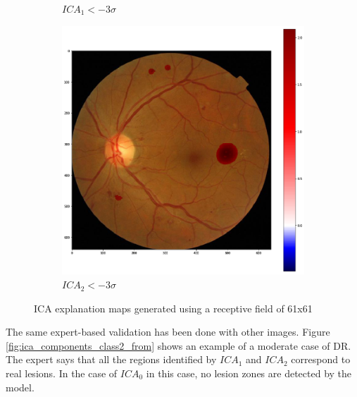 \documentclass[review]{elsarticle}
\theoremstyle{definition} %
\theoremstyle{remark}
\begin{document}
\begin{figure}[h!]
\begin{subfigure}[b]{0.32\textwidth}
		\caption{$ICA_1 < - 3 \sigma$}	
	\end{subfigure}
	\begin{subfigure}[b]{0.32\textwidth}
		\centering
		\includegraphics[width=\textwidth]{./figures/ica_retine_maps/G2-P3/m12.png}
		\caption{$ICA_2 < - 3 \sigma$}	
	\end{subfigure}
	\hfill 
	\caption{ICA explanation maps generated using a receptive field of 61x61}  
	\label{fig:ica_components_class2} 
\end{figure}

The same expert-based validation has been done with other images. Figure \ref{fig:ica_components_class2_from} shows an example of a moderate case of DR. The expert says that all the regions identified by $ICA_1$ and $ICA_2$ correspond to real lesions. In the case of $ICA_0$ in this case, no lesion zones are detected by the model.
\end{document}
